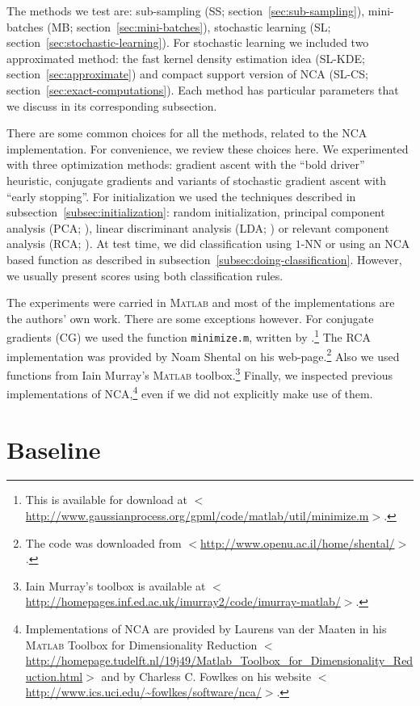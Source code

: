 The methods we test are: sub-sampling (SS; section~\ref{sec:sub-sampling}), mini-batches (MB; section~\ref{sec:mini-batches}), stochastic learning (SL; section~\ref{sec:stochastic-learning}). For stochastic learning we included two approximated method: the fast kernel density estimation idea (SL-KDE; section~\ref{sec:approximate}) and compact support version of NCA (SL-CS; section~\ref{sec:exact-computations}). Each method has particular parameters that we discuss in its corresponding subsection. 

There are some common choices for all the methods, related to the NCA implementation. For convenience, we review these choices here. We experimented with three optimization methods: gradient ascent with the ``bold driver'' heuristic, conjugate gradients and variants of stochastic gradient ascent with ``early stopping''. For initialization we used the techniques described in subsection~\ref{subsec:initialization}: random initialization, principal component analysis (PCA; \citealp{pearson1901}), linear discriminant analysis (LDA; \citealp{fisher1936}) or relevant component analysis (RCA; \cite{bar2003}). At test time, we did classification using $1$-NN or using an NCA based function as described in subsection~\ref{subsec:doing-classification}. However, we usually present scores using both classification rules.

The experiments were carried in \textsc{Matlab} and most of the implementations are the authors' own work. There are some exceptions however. For conjugate gradients (CG) we used the function \texttt{minimize.m}, written by \citet{rasmussen-online}.\footnote{This is available for download at $<$\url{http://www.gaussianprocess.org/gpml/code/matlab/util/minimize.m}$>$.}
 The RCA implementation was provided by Noam Shental on his web-page.\footnote{The code was downloaded from $<$\url{http://www.openu.ac.il/home/shental/}$>$.}
 Also we used functions from Iain Murray's \textsc{Matlab} toolbox.\footnote{Iain Murray's toolbox is available at $<$\url{http://homepages.inf.ed.ac.uk/imurray2/code/imurray-matlab/}$>$.} Finally, we inspected previous implementations of NCA,\footnote{Implementations of NCA are provided by Laurens van der Maaten in his \textsc{Matlab} Toolbox for Dimensionality Reduction $<$\url{http://homepage.tudelft.nl/19j49/Matlab_Toolbox_for_Dimensionality_Reduction.html}$>$ and by Charless C. Fowlkes on his website $<$\url{http://www.ics.uci.edu/~fowlkes/software/nca/}$>$.}
 even if we did not explicitly make use of them.

\section{Baseline}
\label{sec:baseline} 


